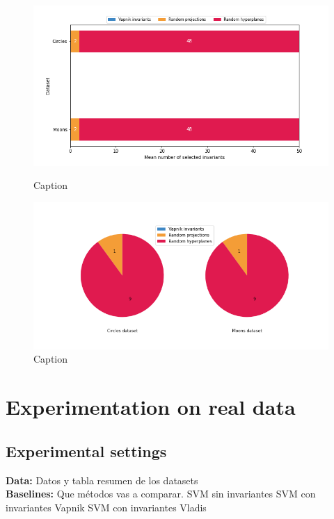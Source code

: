 \begin{figure}
    \centering
    \begin{minipage}{0.5\textwidth}
        \centering
        \includegraphics[width=\textwidth]{thesis/Figures/mean_num_selected_invariants.png}
        \caption{Caption}
        \label{fig:toys_mean_num_selected}
    \end{minipage}%
    \begin{minipage}{0.5\textwidth}
        \centering
        \includegraphics[width=\textwidth]{thesis/Figures/mean_first_selected.png}
        \caption{Caption}
        \label{fig:toys_mean_first_selected}
    \end{minipage}
\end{figure}



\section{Experimentation on real data}
\subsection{Experimental settings}
{\bf Data:} Datos y tabla resumen de los datasets\\
{\bf Baselines:} Que métodos vas a comparar.
SVM sin invariantes
SVM con invariantes Vapnik
SVM con invariantes Vladis

